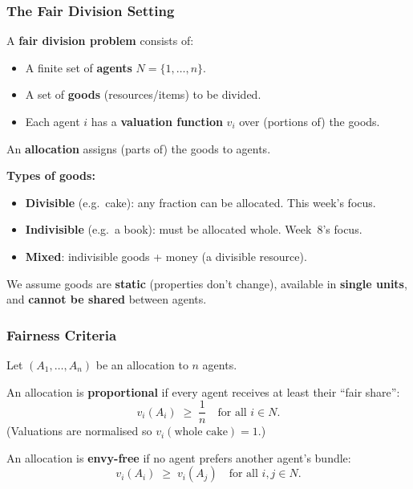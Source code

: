 \bigseparator

\subsubsection{The Fair Division Setting}

\begin{defbox}
A \textbf{fair division problem} consists of:
\begin{itemize}
  \item A finite set of \textbf{agents} $N = \{1, \ldots, n\}$.
  \item A set of \textbf{goods} (resources/items) to be divided.
  \item Each agent $i$ has a \textbf{valuation function} $v_i$ over (portions of) the goods.
\end{itemize}
An \textbf{allocation} assigns (parts of) the goods to agents.
\end{defbox}

\textbf{Types of goods:}
\begin{itemize}
  \item \textbf{Divisible} (e.g.\ cake): any fraction can be allocated. This week's focus.
  \item \textbf{Indivisible} (e.g.\ a book): must be allocated whole. Week~8's focus.
  \item \textbf{Mixed}: indivisible goods + money (a divisible resource).
\end{itemize}

We assume goods are \textbf{static} (properties don't change), available in \textbf{single units}, and \textbf{cannot be shared} between agents.

\separator

\subsubsection{Fairness Criteria}

Let $(A_1, \ldots, A_n)$ be an allocation to $n$ agents.

\begin{defbox}[Proportionality]
An allocation is \textbf{proportional} if every agent receives at least their ``fair share'':
\[
  v_i(A_i) \;\ge\; \frac{1}{n} \quad \text{for all } i \in N.
\]
(Valuations are normalised so $v_i(\text{whole cake}) = 1$.)
\end{defbox}

\begin{defbox}
An allocation is \textbf{envy-free} if no agent prefers another agent's bundle:
\[
  v_i(A_i) \;\ge\; v_i(A_j) \quad \text{for all } i, j \in N.
\]
\end{defbox}

